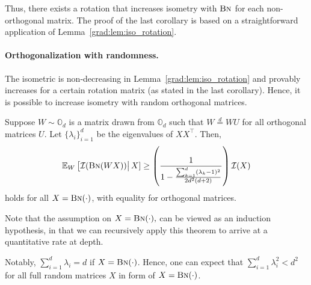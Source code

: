 Thus, there exists a rotation that increases isometry with $\text{\sc{Bn}}$ for each non-orthogonal matrix.
 The proof of the last corollary is based on a straightforward application of Lemma~\ref{grad:lem:iso_rotation}.



\paragraph{Orthogonalization with randomness.}
The isometric is non-decreasing in Lemma~\ref{grad:lem:iso_rotation} and provably increases for a certain rotation matrix (as stated in the last corollary). Hence, it is possible to increase isometry with random orthogonal matrices. 

\begin{theorem}
    Suppose $W \sim \mathbb{O}_d$ is a matrix drawn from $\mathbb{O}_d$ such that $W\stackrel{d}{=} WU$ for all orthogonal matrices $U$. Let $\{\lambda_i\}_{i=1}^d$ be the eigenvalues of $XX^\top$. Then,
    \begin{align}
        \mathbb{E}_W \left[\mathcal{I}(\text{\sc{Bn}}(WX))\right | X] \geq \left( \frac{1}{ 1 - \frac{\sum_{k=1}^d (\lambda_k - 1)^2}{2d^2(d+2)} } \right) \mathcal{I}(X)   
    \end{align}
    holds for all $X = \text{\sc{Bn}}(\cdot)$, with equality for orthogonal matrices.
\end{theorem}
\begin{remark}
    Note that the assumption on $X=\text{\sc{Bn}}(\cdot),$ can be viewed as an induction hypothesis, in that we can recursively apply this theorem to arrive at a quantitative rate at depth. 
\end{remark}
Notably, $\sum_{i=1}^d \lambda_i = d$ if $X = \text{\sc{Bn}}(\cdot)$. Hence, one can expect that $\sum_{i=1}^d \lambda_i^2 < d^2$ for all full random matrices $X$ in form of $X = \text{\sc{Bn}}(\cdot)$. 

